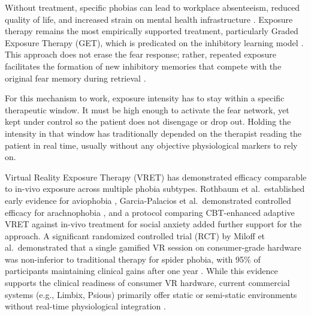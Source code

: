 \documentclass[conference]{IEEEtran}
\begin{document}
Without treatment, specific phobias can lead to workplace absenteeism, reduced quality of life, and increased strain on mental health infrastructure \cite{khanna2022}. Exposure therapy remains the most empirically supported treatment, particularly Graded Exposure Therapy (GET), which is predicated on the inhibitory learning model \cite{craske2014}. This approach does not erase the fear response; rather, repeated exposure facilitates the formation of new inhibitory memories that compete with the original fear memory during retrieval \cite{craske2014}.

For this mechanism to work, exposure intensity has to stay within a specific therapeutic window. It must be high enough to activate the fear network, yet kept under control so the patient does not disengage or drop out. Holding the intensity in that window has traditionally depended on the therapist reading the patient in real time, usually without any objective physiological markers to rely on.

Virtual Reality Exposure Therapy (VRET) has demonstrated efficacy comparable to in-vivo exposure across multiple phobia subtypes. Rothbaum et al.\ established early evidence for aviophobia \cite{rothbaum2000}, Garcia-Palacios et al.\ demonstrated controlled efficacy for arachnophobia \cite{garcia2002}, and a protocol comparing CBT-enhanced adaptive VRET against in-vivo treatment for social anxiety \cite{cbtvr2022} added further support for the approach. A significant randomized controlled trial (RCT) by Miloff et al.\ demonstrated that a single gamified VR session on consumer-grade hardware was non-inferior to traditional therapy for spider phobia, with 95\% of participants maintaining clinical gains after one year \cite{miloff2024}. While this evidence supports the clinical readiness of consumer VR hardware, current commercial systems (e.g., Limbix, Psious) primarily offer static or semi-static environments without real-time physiological integration \cite{ferreira2025}.
\end{document}
